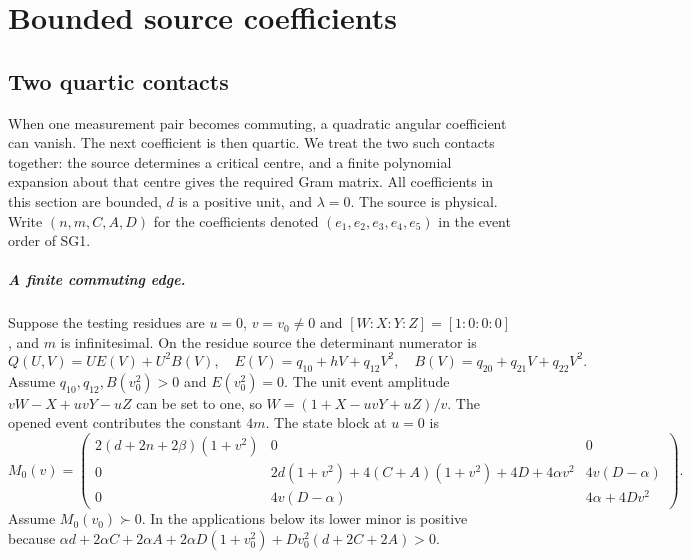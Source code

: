\chapter{Bounded source coefficients}
\label{ch:cert-2}

\section{Two quartic contacts}
\label{component:p4ec1a51262f9}
\label{p4ec1a51262f9:a-full-parent-case-for-a-finite-positive-d-commuting-edge}

When one measurement pair becomes commuting, a quadratic angular
coefficient can vanish. The next coefficient is then quartic. We treat
the two such contacts together: the source determines a critical centre,
and a finite polynomial expansion about that centre gives the required
Gram matrix. All coefficients in this section are bounded, $d$ is a
positive unit, and $\lambda=0$. The source is physical.
Write $(n,m,C,A,D)$ for the coefficients denoted
$(e_1,e_2,e_3,e_4,e_5)$ in the event order of SG1.

\paragraph{A finite commuting edge.}
Suppose the testing residues are $u=0$, $v=v_0\ne0$ and
$[W:X:Y:Z]=[1:0:0:0]$, and $m$ is infinitesimal.
On the residue source the determinant numerator is
\[
 Q(U,V)=UE(V)+U^2B(V),\quad
 E(V)=q_{10}+hV+q_{12}V^2,\quad
 B(V)=q_{20}+q_{21}V+q_{22}V^2.
\]
Assume $q_{10},q_{12},B(v_0^2)>0$ and $E(v_0^2)=0$.
The unit event amplitude $vW-X+uvY-uZ$ can be set to one,
so $W=(1+X-uvY+uZ)/v$. The opened event contributes the
constant $4m$. The state block at $u=0$ is
\[
 M_0(v)=\begin{pmatrix}
 2(d+2n+2\beta)(1+v^2)&0&0\\
 0&2d(1+v^2)+4(C+A)(1+v^2)+4D+4\alpha v^2&4v(D-\alpha)\\
 0&4v(D-\alpha)&4\alpha+4Dv^2
 \end{pmatrix}.
\]
Assume $M_0(v_0)\succ0$. In the applications below its lower
minor is positive because
$\alpha d+2\alpha C+2\alpha A+2\alpha D(1+v_0^2)
+Dv_0^2(d+2C+2A)>0$.

